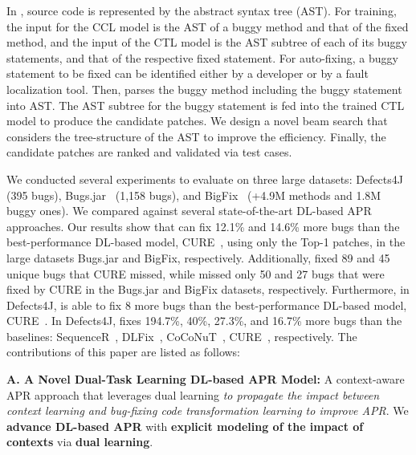 In {\tool}, source code is represented by the abstract syntax tree
(AST). For training, the input for the CCL model is the AST of a buggy
method and that of the fixed method, and the input of the CTL model is
the AST subtree of each of its buggy statements, and that of the
respective fixed statement. For auto-fixing, a buggy statement to be
fixed can be identified either by a developer or by a fault
localization tool.  Then, {\tool} parses the buggy method including
the buggy statement into AST. The AST subtree for the buggy statement
is fed into the trained CTL model to produce the candidate patches. We
design a novel beam search that considers the tree-structure of the
AST to improve the efficiency. Finally, the candidate patches are
ranked and validated via test cases.

We conducted several experiments to evaluate {\tool} on three large
datasets: Defects4J~\cite{defects4j} (395 bugs),
Bugs.jar~\cite{saha2018bugs} (1,158 bugs), and
BigFix~\cite{yioopsla19} (+4.9M methods and 1.8M buggy ones).  We
compared {\tool} against several state-of-the-art DL-based APR
approaches.  Our results show that {\tool} can fix 12.1\% and 14.6\%
more bugs than the best-performance DL-based model,
CURE~\cite{cure-icse21}, using only the Top-1 patches, in the large
datasets Bugs.jar and BigFix, respectively. Additionally, {\tool}
fixed 89 and 45 unique bugs that CURE missed, while {\tool} missed
only 50 and 27 bugs that were fixed by CURE in the Bugs.jar and BigFix
datasets, respectively.  Furthermore, in Defects4J, {\tool} is able to
fix 8 more bugs than the best-performance DL-based model,
CURE~\cite{cure-icse21}.
In Defects4J, {\tool} fixes 194.7\%, 40\%, 27.3\%, and 16.7\% more
bugs than the baselines: SequenceR~\cite{chen2018sequencer},
DLFix~\cite{icse20}, CoCoNuT~\cite{lutellier2020coconut},
CURE~\cite{cure-icse21}, respectively. The contributions of
this paper are listed as follows:


{\bf A. A Novel Dual-Task Learning DL-based APR Model:} A
context-aware APR approach that leverages dual learning {\em to
  propagate the impact between context learning and bug-fixing code
  transformation learning to improve APR}. We {\bf advance
DL-based APR} with {\bf explicit modeling of the impact of contexts} via
  {\bf dual learning}.

